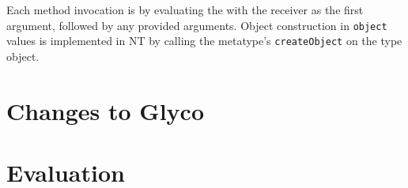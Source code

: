 \documentclass[main.tex]{subfiles}
\begin{document}
Each method invocation is \lowered{} by evaluating the  with the receiver as the first argument, followed by any provided arguments. Object construction in \texttt{object} values is implemented in NT by calling the metatype's \texttt{createObject}  on the type object.

\section{Changes to Glyco} \label{sct:obj-changes}

\section{Evaluation} \label{sct:obj-eval}

\onlyinsubfile{\glsaddall\printglossaries}
\end{document}
